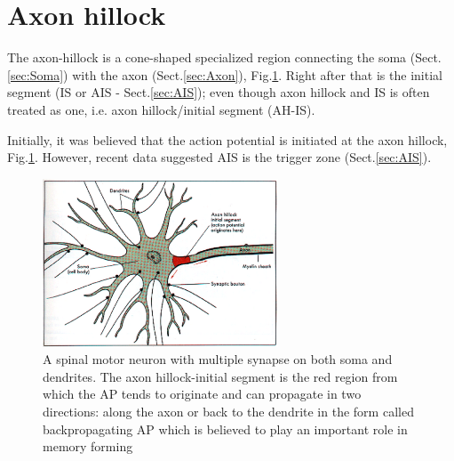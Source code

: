 
\section{Axon hillock}
\label{sec:axon-hillock}

The axon-hillock is a cone-shaped specialized region connecting the soma
(Sect.\ref{sec:Soma}) with the axon (Sect.\ref{sec:Axon}),
Fig.\ref{fig:hillock}. Right after that is the initial segment (IS or AIS -
Sect.\ref{sec:AIS}); even though axon hillock and IS is often treated as one,
i.e. axon hillock/initial segment (AH-IS).

Initially, it was believed that the action potential is initiated at the axon
hillock, Fig.\ref{fig:hillock}. However, recent data suggested AIS is the
trigger zone (Sect.\ref{sec:AIS}).




\begin{figure}[hbt]
 \centerline{\includegraphics[height=5cm, angle=0]{./images/axon_hillock_2.eps}}
\caption{A spinal motor neuron with multiple synapse on both soma and
dendrites. The axon hillock-initial segment is the red region from which the AP
tends to originate and can propagate in two directions: along the axon or back
to the dendrite in the form called backpropagating AP which is believed to play
an important role in memory forming}
\label{fig:hillock}
\end{figure}



